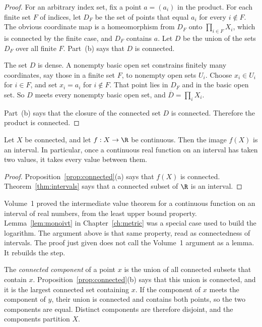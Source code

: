 \begin{proof}
For an arbitrary index set, fix a point $a=(a_i)$ in the product. For each finite set $F$ of indices, let $D_F$ be the set of points that equal $a_i$ for every $i\notin F$. The obvious coordinate map is a homeomorphism from $D_F$ onto $\prod_{i\in F}X_i$, which is connected by the finite case, and $D_F$ contains $a$. Let $D$ be the union of the sets $D_F$ over all finite $F$. Part~(b) says that $D$ is connected.

The set $D$ is dense. A nonempty basic open set constrains finitely many coordinates, say those in a finite set $F$, to nonempty open sets $U_i$. Choose $x_i\in U_i$ for $i\in F$, and set $x_i=a_i$ for $i\notin F$. That point lies in $D_F$ and in the basic open set. So $D$ meets every nonempty basic open set, and $\overline D=\prod_i X_i$.

Part~(b) says that the closure of the connected set $D$ is connected. Therefore the product is connected.
\end{proof}

\begin{corollary}\label{cor:ivt}
Let $X$ be connected, and let $f:X\to\R$ be continuous. Then the image $f(X)$ is an interval. In particular, once a continuous real function on an interval has taken two values, it takes every value between them.
\end{corollary}
\begin{proof}
Proposition~\ref{prop:connected}(a) says that $f(X)$ is connected. Theorem~\ref{thm:intervals} says that a connected subset of $\R$ is an interval.
\end{proof}

Volume~1 proved the intermediate value theorem for a continuous function on an interval of real numbers, from the least upper bound property. Lemma~\ref{lem:monoivt} in Chapter~\ref{ch:metric} was a special case used to build the logarithm. The argument above is that same property, read as connectedness of intervals. The proof just given does not call the Volume~1 argument as a lemma. It rebuilds the step.

The \emph{connected component} of a point $x$ is the union of all connected subsets that contain $x$. Proposition~\ref{prop:connected}(b) says that this union is connected, and it is the largest connected set containing $x$. If the component of $x$ meets the component of $y$, their union is connected and contains both points, so the two components are equal. Distinct components are therefore disjoint, and the components partition $X$.

